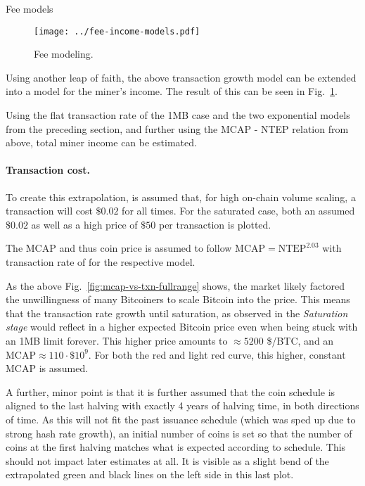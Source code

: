 \documentclass{article}
\begin{document}
\begin{section}{Fee models}
  \begin{figure}
    \texttt{[image: ../fee-income-models.pdf]}
    \caption{Fee modeling.\label{fig:fee-income-models}}
  \end{figure}
  
  Using another leap of faith, the above transaction growth model can be
  extended into a model for the miner's income. The result of this can be seen
  in Fig.~\ref{fig:fee-income-models}.

  Using the flat transaction rate of the 1MB case and the two exponential
  models from the preceding section, and further using the MCAP - NTEP
  relation from above, total miner income can be estimated.
  
  \paragraph{Transaction cost.}{To create this extrapolation,
    is assumed that, for high on-chain volume scaling, a transaction will cost
    $\$0.02$ for all times. For the saturated case, both an assumed $\$0.02$
    as well as a high price of $\$50$ per transaction is plotted.}
  
  The MCAP and thus coin price is assumed to follow
  $\mathrm{MCAP}=\mathrm{NTEP}^{2.03}$ with transaction rate of for the respective
  model.

  As the above Fig.~\ref{fig:mcap-vs-txn-fullrange} shows, the market likely
  factored the unwillingness of many Bitcoiners to scale Bitcoin into the
  price. This means that the transaction rate growth until saturation, as
  observed in the \emph{Saturation stage} would reflect in a higher expected
  Bitcoin price even when being stuck with an 1MB limit forever. This higher
  price amounts to $\approx 5200$ \$/BTC, and an $\mathrm{MCAP}\approx 110
  \cdot \$ 10^9 $. For both the red and light red curve, this higher, constant
  MCAP is assumed.

  A further, minor point is that it is further assumed that the coin schedule
  is aligned to the last halving with exactly 4 years of halving time, in both
  directions of time. As this will not fit the past issuance schedule (which
  was sped up due to strong hash rate growth), an initial number of coins is
  set so that the number of coins at the first halving matches what is
  expected according to schedule. This should not impact later estimates at
  all. It is visible as a slight bend of the extrapolated green and black lines
  on the left side in this last plot.


\end{section}
\end{document}

